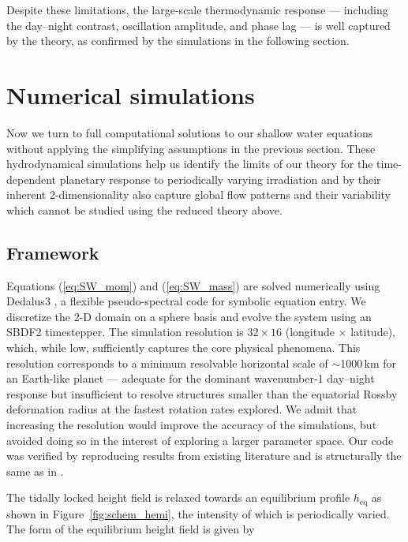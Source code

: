 \documentclass[trackchanges,twocolumn]{aastex7}
\begin{document}
Despite these limitations, the large-scale thermodynamic response — including the day--night contrast, oscillation amplitude, and phase lag — is well captured by the theory, as confirmed by the simulations in the following section.

\section{Numerical simulations}
\label{sec:simulations}

Now we turn to full computational solutions to our shallow water equations without applying the simplifying assumptions in the previous section. These hydrodynamical simulations help us identify the limits of our theory for the time-dependent planetary response to periodically varying irradiation and by their inherent 2-dimensionality also capture global flow patterns and their variability which cannot be studied using the reduced theory above.

\subsection{Framework}

Equations (\ref{eq:SW_mom}) and (\ref{eq:SW_mass}) are solved numerically using Dedalus3 \citep{burns2020dedalus}, a flexible pseudo-spectral code for symbolic equation entry. We discretize the 2-D domain on a sphere basis and evolve the system using an SBDF2 timestepper. The simulation resolution is $32 \times 16$ (longitude $\times$ latitude), which, while low, sufficiently captures the core physical phenomena. This resolution corresponds to a minimum resolvable horizontal scale of $\sim$1000\,km for an Earth-like planet — adequate for the dominant wavenumber-1 day--night response but insufficient to resolve structures smaller than the equatorial Rossby deformation radius at the fastest rotation rates explored. We admit that increasing the resolution would improve the accuracy of the simulations, but avoided doing so in the interest of exploring a larger parameter space. Our code was verified by reproducing results from existing literature \citep{perez2013atmospheric, penn2017thermal, ohno2019atmospheres} and is structurally the same as in \cite{Banik2025}.

The tidally locked height field is relaxed towards an equilibrium profile $h_{\text{eq}}$ as shown in Figure~\ref{fig:schem_hemi}, the intensity of which is periodically varied. The form of the equilibrium height field is given by
\end{document}
